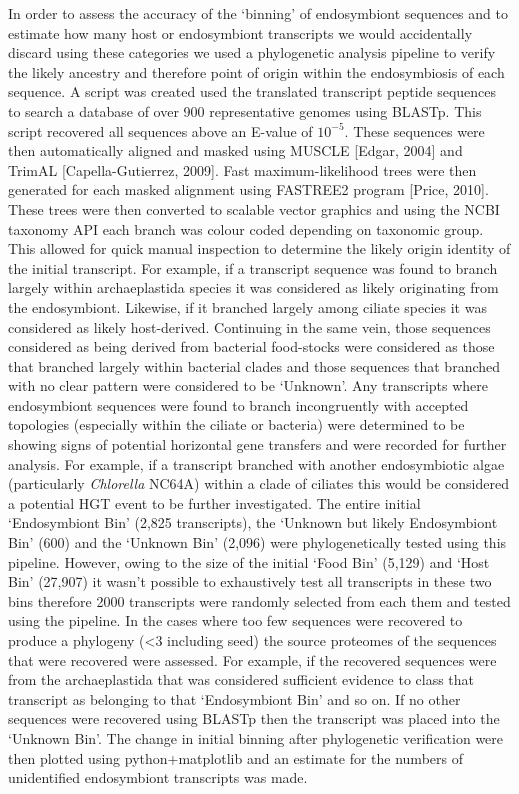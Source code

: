\documentclass[a4paper,11pt]{article}
\begin{document}
In order to assess the accuracy of the `binning' of endosymbiont sequences and to estimate how many host or endosymbiont transcripts we would accidentally discard using these categories we used a phylogenetic analysis pipeline to verify the likely ancestry and therefore point of origin within the endosymbiosis of each sequence.  
A script was created used the translated transcript peptide sequences to search a database of over 900 representative genomes using BLASTp.  This script recovered all sequences above an E-value of $10^{-5}$. 
These sequences were then automatically aligned and masked using MUSCLE [Edgar, 2004] and TrimAL [Capella-Gutierrez, 2009]. 
Fast maximum-likelihood trees were then generated for each masked alignment using FASTREE2 program [Price, 2010].  
These trees were then converted to scalable vector graphics and using the NCBI taxonomy API each branch was colour coded depending on taxonomic group.  
This allowed for quick manual inspection to determine the likely origin identity of the initial transcript.  
For example, if a transcript sequence was found to branch largely within archaeplastida species it was considered as likely originating from the endosymbiont.  
Likewise, if it branched largely among ciliate species it was considered as likely host-derived.  
Continuing in the same vein, those sequences considered as being derived from bacterial food-stocks were considered as those that branched largely within bacterial clades and those sequences that branched with no clear pattern were considered to be `Unknown'.  
Any transcripts where endosymbiont sequences were found to branch incongruently with accepted topologies (especially within the ciliate or bacteria) were determined to be showing signs of potential horizontal gene transfers and were recorded for further analysis.  
For example, if a transcript branched with another endosymbiotic algae (particularly \textit{Chlorella} NC64A) within a clade of ciliates this would be considered a potential HGT event to be further investigated.
The entire initial `Endosymbiont Bin' (2,825 transcripts), the `Unknown but likely Endosymbiont Bin' (600) and the `Unknown Bin' (2,096) were phylogenetically tested using this pipeline.  
However, owing to the size of the initial `Food Bin' (5,129) and `Host Bin' (27,907) it wasn't possible to exhaustively test all transcripts in these two bins therefore 2000 transcripts were randomly selected from each them and tested using the pipeline. 
In the cases where too few sequences were recovered to produce a phylogeny (<3 including seed) the source proteomes of the sequences that were recovered were assessed. For example, if the recovered sequences were from the archaeplastida that was considered sufficient evidence to class that transcript as belonging to that `Endosymbiont Bin' and so on.  If no other sequences were recovered using BLASTp then the transcript was placed into the `Unknown Bin'.
The change in initial binning after phylogenetic verification were then plotted using python+matplotlib and an estimate for the numbers of unidentified endosymbiont transcripts was made.
\end{document}
